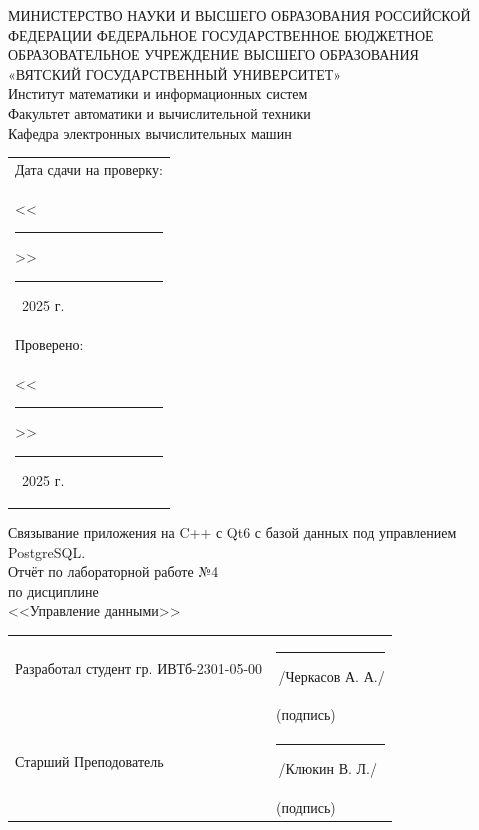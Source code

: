 \documentclass[oneside,a4paper,14pt]{extarticle}
\begin{document}
\newpage
\thispagestyle{empty}
\begin{center}
  МИНИСТЕРСТВО НАУКИ И ВЫСШЕГО ОБРАЗОВАНИЯ РОССИЙСКОЙ ФЕДЕРАЦИИ ФЕДЕРАЛЬНОЕ ГОСУДАРСТВЕННОЕ БЮДЖЕТНОЕ ОБРАЗОВАТЕЛЬНОЕ УЧРЕЖДЕНИЕ ВЫСШЕГО ОБРАЗОВАНИЯ\\
  «ВЯТСКИЙ ГОСУДАРСТВЕННЫЙ УНИВЕРСИТЕТ»\\
  Институт математики и информационных систем\\
  Факультет автоматики и вычислительной техники\\
  Кафедра электронных вычислительных машин
\end{center}
\vspace{10mm}

\hfill
\begin{tabular}{l}
  \footnotesize Дата сдачи на проверку:                                          \\
  \footnotesize <<\rule[-1mm]{5mm}{0.10mm}\/>>\rule[-1mm]{20mm}{0.10mm}\ 2025 г. \\
  \footnotesize Проверено:                                                       \\
  \footnotesize <<\rule[-1mm]{5mm}{0.10mm}\/>>\rule[-1mm]{20mm}{0.10mm}\ 2025 г. \\
\end{tabular}
\vfill

\begin{center}
  Связывание приложения на C++ с Qt6 с базой данных под управлением PostgreSQL.\\
  Отчёт по лабораторной работе №4\\
  по дисциплине\\
  <<Управление данными>>\\
\end{center}
\vspace{25mm}
\noindent
\begin{tabular}{ll}
  Разработал студент гр. ИВТб-2301-05-00 & \hspace{18mm}\rule[-1mm]{30mm}{0.10mm}\,/Черкасов А. А./ \\
                                         & \hspace{25.5mm}\footnotesize(подпись)                    \\
  Старший Преподователь                  & \hspace{18mm}\rule[-1mm]{30mm}{0.10mm}\,/Клюкин В. Л./   \\
                                         & \hspace{25.5mm}\footnotesize(подпись)                    \\
\end{tabular}
\end{document}

